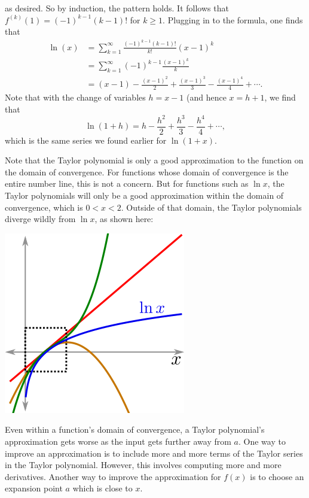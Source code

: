 \documentclass[a4paper]{book}
\begin{document}
\begin{sloppypar}
\begin{examplebox}
\begin{equation*}
\end{equation*}
as desired. So by induction, the pattern holds. It follows that $f^{\left(k\right)}(1) = (-1)^{k-1}(k-1)!$ for $k \geq 1$. Plugging in to the formula, one finds that
\begin{align*} 
\ln(x) &= \sum_{k=1}^\infty \frac{(-1)^{k-1}(k-1)!}{k!}(x-1)^k \\
&= \sum_{k=1}^\infty (-1)^{k-1} \frac{(x-1)^k}{k} \\
&= (x-1) - \frac{(x-1)^2}{2} + \frac{(x-1)^3}{3} - \frac{(x-1)^4}{4}+\dotsb.
\end{align*}
Note that with the change of variables $h = x-1$ (and hence $x = h+1$, we find that \[ \ln(1+h) = h - \frac{h^2}{2} + \frac{h^3}{3} - \frac{h^4}{4} + \dotsb, \] which is the same series we found earlier for  $\ln(1+x)$.
\end{examplebox}
Note that the Taylor polynomial is only a good approximation to the function on the domain of convergence. For functions whose domain of convergence is the entire number line, this is not a concern. But for functions such as $\ln x$, the Taylor polynomials will only be a good approximation within the domain of convergence, which is $0 < x < 2$. Outside of that domain, the Taylor polynomials diverge wildly from $\ln x$, as shown here:
\begin{center}\includegraphics[scale=0.6]{NaturalLogApproximation}\end{center}
Even within a function's domain of convergence, a Taylor polynomial's approximation gets worse as the input gets further away from $a$. One way to improve an approximation is to include more and more terms of the Taylor series in the Taylor polynomial. However, this involves computing more and more derivatives. Another way to improve the approximation for $f(x)$ is to choose an expansion point $a$ which is close to $x$.\\

\end{sloppypar}
\end{document}
